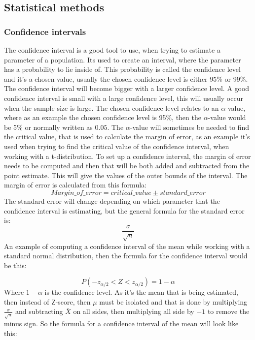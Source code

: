 \subsection{Statistical methods}

\subsubsection{Confidence intervals}
The confidence interval is a good tool to use, when trying to estimate a parameter of a population. Its used to create an interval, where the parameter has a probability to lie inside of. This probability is called the confidence level and it's a chosen value, usually the chosen confidence level is either 95\% or 99\%. The confidence interval will become bigger with a larger confidence level. A good confidence interval is small with a large confidence level, this will usually occur when the sample size is large. The chosen confidence level relates to an $\alpha$-value, where as an example the chosen confidence level is 95\%, then the $\alpha$-value would be 5\% or normally written as $0.05$. The $\alpha$-value will sometimes be needed to find the critical value, that is used to calculate the margin of error, as an example it's used when trying to find the critical value of the confidence interval, when working with a t-distribution.
\newline
To set up a confidence interval, the margin of error needs to be computed and then that will be both added and subtracted from the point estimate. This will give the values of the outer bounds of the interval. The margin of error is calculated from this formula:
$$Margin\_of\_error = critical\_value \pm standard\_error$$
\newline
The standard error will change depending on which parameter that the confidence interval is estimating, but the general formula for the standard error is:
$$\frac{\sigma}{\sqrt{n}}$$
\newline
An example of computing a confidence interval of the mean while working with a standard normal distribution, then the formula for the confidence interval would be this:

$$P(-z_{\alpha/2}<Z<z_{\alpha/2}) = 1-\alpha$$
\newline
Where $1-\alpha$ is the confidence level. As it's the mean that is being estimated, then instead of Z-score, then $\mu$ must be isolated and that is done by multiplying $\frac{\sigma}{\sqrt{n}}$ and subtracting $\bar{X}$ on all sides, then multiplying all side by $-1$ to remove the minus sign. So the formula for a confidence interval of the mean will look like this:

